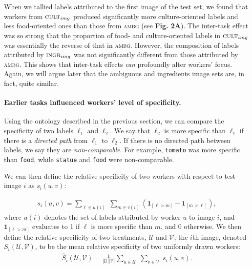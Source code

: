 \documentclass[letterpaper]{article}
\begin{document}
When we tallied labels attributed to the first image of the test set, 
we found that workers from $\textsc{cult}_{img}$ produced significantly 
more culture-oriented labels and less food-oriented ones than those from
\textsc{ambg}
(see \textbf{Fig. 2A}).  The inter-task effect was so strong that the 
proportion of food- and culture-oriented labels in $\textsc{cult}_{img}$ was
essentially the reverse of that in \textsc{ambg}.  However, the 
composition of labels attributed by $\textsc{ingr}_{img}$
was not significantly different from those attributed by \textsc{ambg}.  This 
shows that inter-task effects \textit{can} profoundly alter workers' focus. 
Again, we 
will argue later that the ambiguous and ingredients image sets are, in fact, 
quite similar.
\paragraph{Earlier tasks influenced workers' level of specificity.} 
Using the ontology described in the previous section, we can compare the 
specificity of two labels $\ell_1$ and $\ell_2$. We say that $\ell_2$ is more 
specific than $\ell_1$ if there is a \textit{directed path} from $\ell_1$ to 
$\ell_2$.  If there is no directed path between labels, we say they are  
\textit{non-comparable}.  For example, \texttt{tomato} was more specific than 
\texttt{food}, while \texttt{statue} and \texttt{food} were non-comparable.

We can then define the relative specificity of two workers with respect to 
test-image $i$ as $s_i(u,v)$:

\begin{align}
	s_i(u,v) = \sum_{\ell \in u(i) } \;
	\sum_{m \in v(i)} 
	\left(\mathbf{1}_{[\ell > m]} - \mathbf{1}_{[m>\ell]}\right),
	\label{eq:worker-specificity}
\end{align}
where $u(i)$ denotes the set of labels attributed by worker $u$ to image $i$, 
and $\mathbf{1}_{[\ell > m]}$ evaluates to 1 if $\ell$ is more specific than 
$m$, and 0 otherwise.
We then define the relative specificity of two treatments, $\mathcal{U}$ and 
$\mathcal{V}$, the $i$th image, denoted $S_i(\mathcal{U},\mathcal{V})$, to be 
the mean relative specificity of two uniformly drawn workers:  
\begin{align}
	\hat{S}_i(\mathcal{U},\mathcal{V}) = 
	\frac{1}{|\mathcal{U}| |\mathcal{V}|}
	\sum_{u \in \mathcal{U}} \;
	\sum_{v \in \mathcal{V}} \;
		s_i(u,v).
		\label{eq:specificity}
\end{align}
\end{document}
